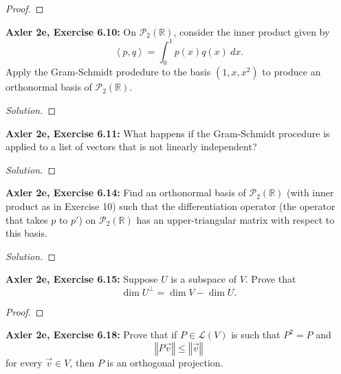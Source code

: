 \documentclass{article}
\newcommand{\R}{\mathbb{R}}
\newcommand{\norm}[1]{\left\Vert #1 \right\Vert}
\newcommand{\iprod}[2]{\left\langle #1, #2 \right\rangle}
\begin{document}
\begin{proof}
    
\end{proof}


\newpage %


\textbf{Axler 2e, Exercise 6.10: }
On $\mathcal{P}_2(\R)$, consider the inner product given by
$$\iprod{p}{q} = \int_0^1 p(x) q(x) \: dx.$$
Apply the Gram-Schmidt prodedure to the basis $(1, x, x^2)$ to produce an orthonormal basis of $\mathcal{P}_2(\R)$.

\begin{proof}[Solution]
    
\end{proof}

\newpage %

\textbf{Axler 2e, Exercise 6.11: }
What happens if the Gram-Schmidt procedure is applied to a list of vectors that is not linearly independent?

\begin{proof}[Solution]
    
\end{proof}


\newpage %


\textbf{Axler 2e, Exercise 6.14: }
Find an orthonormal basis of $\mathcal{P}_2(\R)$ (with inner product as in Exercise 10) such that the differentiation operator (the operator that takes $p$ to $p'$) on $\mathcal{P}_2(\R)$ has an upper-triangular matrix with respect to this basis.

\begin{proof}[Solution]
    
\end{proof}


\newpage %


\textbf{Axler 2e, Exercise 6.15: }
Suppose $U$ is a subspace of $V$. Prove that
$$\dim U^\perp = \dim V - \dim U.$$

\begin{proof}
    
\end{proof}


\newpage %


\textbf{Axler 2e, Exercise 6.18: }
Prove that if $P \in \mathcal{L}(V)$ is such that $P^2 = P$ and
$$\norm{P\vec v} \le \norm{\vec v}$$
for every $\vec v \in V$, then $P$ is an orthogonal projection.
\end{document}
